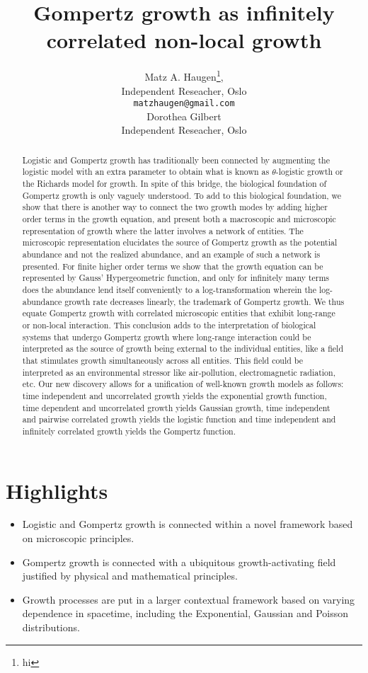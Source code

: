 \documentclass{article}
\title{Gompertz growth as infinitely correlated non-local growth}
\author{Matz A. Haugen\footnote{hi}, \\
Independent Reseacher, Oslo\\
\texttt{matzhaugen@gmail.com} \\
  \And
  Dorothea Gilbert \\
  Independent Reseacher, Oslo\\
}
\begin{document}
\maketitle

\begin{abstract}
Logistic and Gompertz growth has traditionally been connected by augmenting the logistic model with an extra parameter to obtain what is known as $\theta$-logistic growth or the Richards model for growth. In spite of this bridge, the biological foundation of Gompertz growth is only vaguely understood. 
To add to this biological foundation, we show that there is another way to connect the two growth modes by adding higher order terms in the growth equation, and present both a macroscopic and microscopic representation of growth where the latter involves a network of entities. 
The microscopic representation elucidates the source of Gompertz growth as the potential abundance and not the realized abundance, and an example of such a network is presented. 
For finite higher order terms we show that the growth equation can be represented by Gauss' Hypergeometric function, and only for infinitely many terms does the abundance lend itself conveniently to a log-transformation wherein the log-abundance growth rate decreases linearly, the trademark of Gompertz growth. We thus equate Gompertz growth with correlated microscopic entities that exhibit long-range or non-local interaction. 
This conclusion adds to the interpretation of biological systems that undergo Gompertz growth where long-range interaction could be interpreted as the source of growth being external to the individual entities, like a field that stimulates growth simultaneously across all entities. 
This field could be interpreted as an environmental stressor like air-pollution, electromagnetic radiation, etc.
Our new discovery allows for a unification of well-known growth models as follows: time independent and uncorrelated growth yields the exponential growth function, time dependent and uncorrelated growth yields Gaussian growth, time independent and pairwise correlated growth yields the logistic function and time independent and infinitely correlated growth yields the Gompertz function. 

\end{abstract}


\section*{Highlights}
\begin{itemize}
\item Logistic and Gompertz growth is connected within a novel framework based on microscopic principles.
\item Gompertz growth is connected with a ubiquitous growth-activating field justified by physical and mathematical principles.
\item Growth processes are put in a larger contextual framework based on varying dependence in spacetime, including the Exponential, Gaussian and Poisson distributions. 
\end{itemize}
\end{document}
